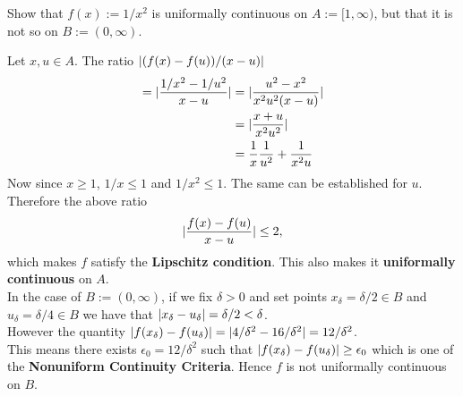 \documentclass[boxes, qed]{homework}
\DeclarePairedDelimiter\abs{\lvert}{\rvert}
\begin{document}
\newenvironment{amatrix}[1]{%
  \left[\begin{array}{@{}*{#1}{c}|c@{}}
}{%
  \end{array}\right]
}

\newenvironment{augmatrix}[1]{%
  \left[\begin{array}{#1}
}{%
  \end{array}\right]
}
\begin{problem}Show that $f(x):=1/x^2$ is uniformally continuous on $A:=[1,\infty)$,
  but that it is not so on $B:=(0,\infty)$.
\end{problem}
\begin{solution}Let $x,u\in{A}$. The ratio $\abs{(f(x)-f(u))/(x-u)}$
  \begin{align*}
    = \abs{\frac{1/x^2-1/u^2}{x-u}}
    &= \abs{\frac{u^2-x^2}{x^2u^2(x-u)}}\\
    &= \abs{\frac{x+u}{x^2u^2}}\\
    &= \frac{1}{x}\frac{1}{u^2} + \frac{1}{x^2u}
  \end{align*}
  Now since $x\ge{1}$, $1/x\le{1}$ and $1/x^2\le{1}$. The same can be established
  for $u$. Therefore the above ratio
  \begin{align*}
    \abs{\frac{f(x)-f(u)}{x-u}} \le 2,
  \end{align*}
  which makes $f$ satisfy the \textbf{Lipschitz condition}. This also makes
  it \textbf{uniformally continuous} on $A$.\\

  In the case of $B:=(0,\infty)$, if we fix $\delta>0$ and set points $x_\delta=\delta/2\in{B}$
  and $u_\delta=\delta/4\in{B}$ we  have that $\abs{x_\delta-u_\delta}=\delta/2<\delta$.\\
  However the quantity $\abs{f(x_\delta)-f(u_\delta)}=\abs{4/\delta^2-16/\delta^2}=12/\delta^2$.\\
  This means there exists $\epsilon_0=12/\delta^2$ such that $\abs{f(x_\delta)-f(u_\delta)}\ge{\epsilon_0}$
  which is one of the \textbf{Nonuniform Continuity Criteria}. Hence $f$ is not uniformally
  continuous on $B$.
\end{solution}
\end{document}
